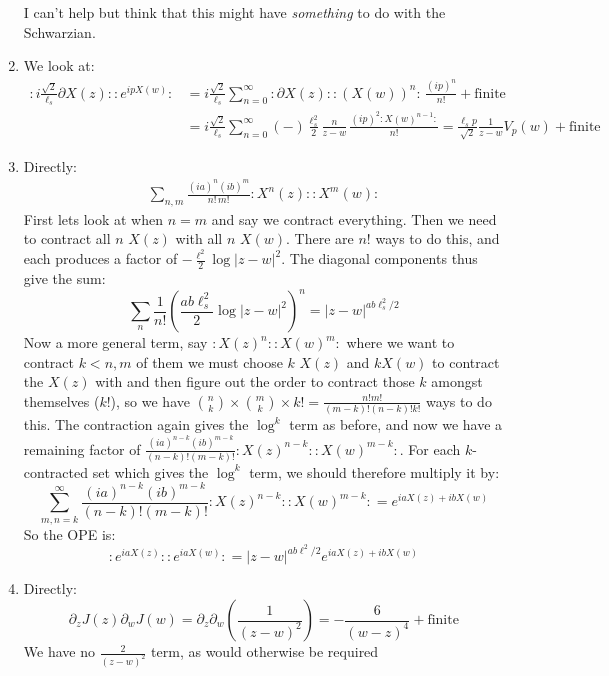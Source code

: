 \documentclass[11pt]{article}
\begin{document}
\begin{enumerate}
	I can't help but think that this might have \emph{something} to do with the Schwarzian. 
	
	\item We look at:
	\[
	\begin{aligned}
		:i \frac{\sqrt 2}{\ell_s} \partial X(z): :e^{i p X(w)}: 
		&= i \frac{\sqrt 2}{\ell_s} \sum_{n=0}^\infty :\partial X(z): :(X(w))^n: \, \frac{(i p)^n}{n!} + \text{finite}\\
		&= i \frac{\sqrt 2}{\ell_s} \sum_{n=0}^\infty (-) \frac{\ell_s^2}{2} \frac{n}{z-w} \, \frac{(i p)^2 :X(w)^{n-1}:}{n!} = \frac{\ell_s p}{\sqrt2} \frac{1}{z-w} V_p(w) + \text{finite}
	\end{aligned}
	\]
	
	\item Directly:
	\[
	\begin{aligned}
		\sum_{n, m} \frac{(i a)^n (i b)^m}{n!\, m!} :X^n(z): :X^m(w):
	\end{aligned}
	\]
	First lets look at when $n = m$ and say we contract everything. Then we need to contract all $n$ $X(z)$ with all $n$ $X(w)$. There are $n!$ ways to do this, and each produces a factor of $-\frac{\ell^2}{2} \log |z-w|^2$. The diagonal components thus give the sum:
	\[
		\sum_n \frac{1}{n!} \left(\frac{ab \ell_s^2}{2} \log |z-w|^2 \right)^n = |z-w|^{a b \ell_s^2/2}
	\]
	Now a more general term, say $:X(z)^n: :X(w)^m:$ where we want to contract $k < n,m$ of them we must choose $k$ $X(z)$ and $k X(w)$ to contract the $X(z)$ with and then figure out the order to contract those $k$ amongst themselves ($k!$), so we have ${n \choose k} \times {m \choose k} \times k! = \frac{n! m!}{(m-k)! (n-k)! k!}$ ways to do this. The contraction again gives the $\log^k$ term as before, and now we have a remaining factor of $\frac{(ia)^{n-k} (ib)^{m-k}}{(n-k)! (m-k)!} :X(z)^{n-k}: :X(w)^{m-k}:$. For each $k$-contracted set which gives the $\log^k$ term, we should therefore multiply it by:
	\[
		\sum_{m,n=k}^\infty \frac{(ia)^{n-k} (ib)^{m-k}}{(n-k)! (m-k)!} :X(z)^{n-k}: :X(w)^{m-k}: = e^{i a X(z) + i b X(w)}
	\]
	So the OPE is:
	\[
		:e^{i a X(z)}: :e^{i a X(w)}: = |z-w|^{a b \ell^2/2} e^{i a X(z) + i b X(w)}
	\]
	
	\item Directly:
	\[
		\partial_z J(z) \partial_w J(w) = \partial_z \partial_w \left(\frac{1}{(z-w)^2} \right) = -\frac{6}{(w-z)^4} + \text{finite}
	\]
	We have no $\frac{2}{(z-w)^2}$ term, as would otherwise be required
	

\end{enumerate}
\end{document}
